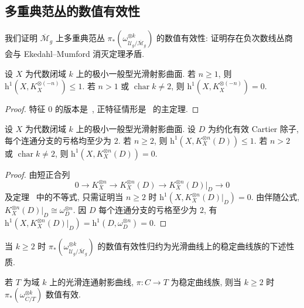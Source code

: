 \subsection{多重典范丛的数值有效性}\label{src:6.9.4-subsection}
我们证明 $\overline{\mathcal M}_g$ 上多重典范丛 $\pi_*(\omega_{\mathcal U_g/\overline{\mathcal M}_g}^{\otimes k})$ 的数值有效性: 证明存在负次数线丛商会与 Ekedahl--Mumford 消灭定理矛盾.
\begin{theorem}\label{src:6.9.19}
设 $X$ 为代数闭域 $k$ 上的极小一般型光滑射影曲面. 若 $n\geq1$, 则 $\mathrm h^1(X,\allowbreak K_X^{\otimes(-n)})\leq1$. 若 $n>1$ 或 $\operatorname{char}k\ne2$, 则 $\mathrm h^1(X,\allowbreak K_X^{\otimes(-n)})=0$.
\end{theorem}
\begin{proof}
特征 $0$ 的版本是~\cite[定理 2]{Mum67}, 正特征情形是~\cite{Eke88} 的主定理.
\end{proof}
\begin{corollary}\label{src:6.9.20}
设 $X$ 为代数闭域 $k$ 上的极小一般型光滑射影曲面. 设 $D$ 为约化有效 Cartier 除子, 每个连通分支的亏格均至少为 $2$. 若 $n\geq2$, 则 $\mathrm h^1(X,\allowbreak K_X^{\otimes n}(D))\leq1$. 若 $n>2$ 或 $\operatorname{char}k\ne2$, 则 $\mathrm h^1(X,\allowbreak K_X^{\otimes n}(D))=0$.
\end{corollary}
\begin{proof}
由短正合列
\[
0\longrightarrow K_X^{\otimes n}\longrightarrow K_X^{\otimes n}(D)\longrightarrow K_X^{\otimes n}(D)|_D\longrightarrow0
\]
及定理~ 中的不等式, 只需证明当 $n\geq2$ 时 $\mathrm h^1(X,\allowbreak K_X^{\otimes n}(D)|_D)=0$. 由伴随公式, $K_X^{\otimes n}(D)|_D\cong\omega_D^{\otimes n}$. 因 $D$ 每个连通分支的亏格至少为 $2$, 有 $\mathrm h^1(X,\allowbreak K_X^{\otimes n}(D)|_D)=\mathrm h^1(D,\allowbreak \omega_D^{\otimes n})=0$.
\end{proof}
当 $k\geq2$ 时 $\pi_*(\omega_{\mathcal U_g/\overline{\mathcal M}_g}^{\otimes k})$ 的数值有效性归约为光滑曲线上的稳定曲线族的下述性质.
\begin{theorem}\label{src:6.9.21}
若 $T$ 为域 $k$ 上的光滑连通射影曲线, $\pi:C\to\allowbreak T$ 为稳定曲线族, 则当 $k\geq2$ 时 $\pi_*(\omega_{C/T}^{\otimes k})$ 数值有效.
\end{theorem}
